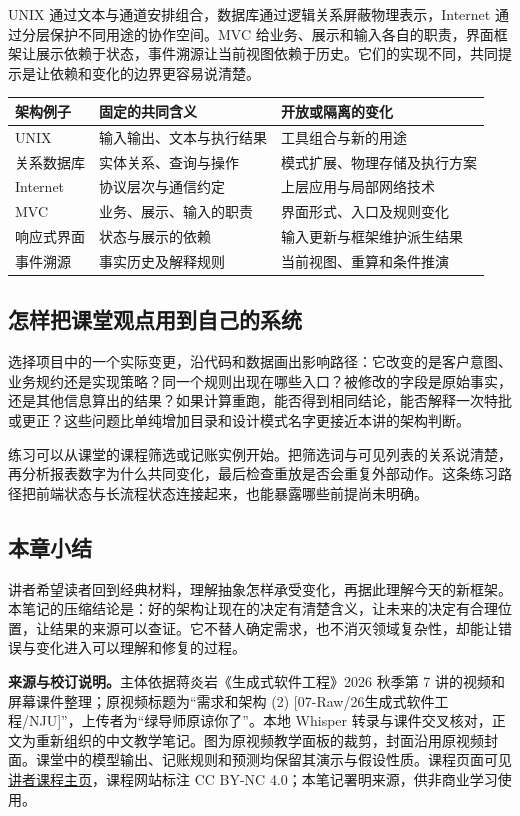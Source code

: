 \documentclass[a4paper]{article}
\begin{document}
UNIX 通过文本与通道安排组合，数据库通过逻辑关系屏蔽物理表示，Internet 通过分层保护不同用途的协作空间。MVC 给业务、展示和输入各自的职责，界面框架让展示依赖于状态，事件溯源让当前视图依赖于历史。它们的实现不同，共同提示是让依赖和变化的边界更容易说清楚。

\begin{center}
\begin{tabular}{p{2.2cm}p{5.2cm}p{6cm}}
\toprule
架构例子 & 固定的共同含义 & 开放或隔离的变化\\
\midrule
UNIX & 输入输出、文本与执行结果 & 工具组合与新的用途\\
关系数据库 & 实体关系、查询与操作 & 模式扩展、物理存储及执行方案\\
Internet & 协议层次与通信约定 & 上层应用与局部网络技术\\
MVC & 业务、展示、输入的职责 & 界面形式、入口及规则变化\\
响应式界面 & 状态与展示的依赖 & 输入更新与框架维护派生结果\\
事件溯源 & 事实历史及解释规则 & 当前视图、重算和条件推演\\
\bottomrule
\end{tabular}
\end{center}

\subsection{怎样把课堂观点用到自己的系统}
选择项目中的一个实际变更，沿代码和数据画出影响路径：它改变的是客户意图、业务规约还是实现策略？同一个规则出现在哪些入口？被修改的字段是原始事实，还是其他信息算出的结果？如果计算重跑，能否得到相同结论，能否解释一次特批或更正？这些问题比单纯增加目录和设计模式名字更接近本讲的架构判断。

练习可以从课堂的课程筛选或记账实例开始。把筛选词与可见列表的关系说清楚，再分析报表数字为什么共同变化，最后检查重放是否会重复外部动作。这条练习路径把前端状态与长流程状态连接起来，也能暴露哪些前提尚未明确。

\subsection{本章小结}
讲者希望读者回到经典材料，理解抽象怎样承受变化，再据此理解今天的新框架。本笔记的压缩结论是：好的架构让现在的决定有清楚含义，让未来的决定有合理位置，让结果的来源可以查证。它不替人确定需求，也不消灭领域复杂性，却能让错误与变化进入可以理解和修复的过程。

\noindent\textbf{来源与校订说明。}主体依据蒋炎岩《生成式软件工程》2026 秋季第 7 讲的视频和屏幕课件整理；原视频标题为“需求和架构 (2) [07-Raw/26生成式软件工程/NJU]”，上传者为“绿导师原谅你了”。本地 Whisper 转录与课件交叉核对，正文为重新组织的中文教学笔记。图为原视频教学面板的裁剪，封面沿用原视频封面。课堂中的模型输出、记账规则和预测均保留其演示与假设性质。课程页面可见\href{https://jyywiki.cn/GSE/2026/}{讲者课程主页}，课程网站标注 CC BY-NC 4.0；本笔记署明来源，供非商业学习使用。

\end{document}
